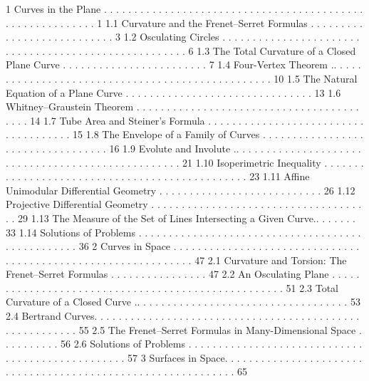 \documentclass[a4paper,10pt]{article}
\begin{document}
1 Curves in the Plane 
. . . . . . . . . . . . . . . . . . . . . . . . . . . . . . . . . . . . . . . . . . . . . . . . . . . . . . . . . . 1
1.1 Curvature and the Frenet–Serret Formulas 
. . . . . . . . . . . . . . . . . . . . . . . . . . . 3
1.2 Osculating Circles 
. . . . . . . . . . . . . . . . . . . . . . . . . . . . . . . . . . . . . . . . . . . . . . . . . . . . . 6
1.3 The Total Curvature of a Closed Plane Curve
. . . . . . . . . . . . . . . . . . . . . . . . 7
1.4 Four-Vertex Theorem
.. . . . . . . . . . . . . . . . . . . . . . . . . . . . . . . . . . . . . . . . . . . . . . . . . 10
1.5 The Natural Equation of a Plane Curve
. . . . . . . . . . . . . . . . . . . . . . . . . . . . . . . 13
1.6 Whitney–Graustein Theorem
. . . . . . . . . . . . . . . . . . . . . . . . . . . . . . . . . . . . . . . . . 14
1.7 Tube Area and Steiner’s Formula
. . . . . . . . . . . . . . . . . . . . . . . . . . . . . . . . . . . . . 15
1.8 The Envelope of a Family of Curves
. . . . . . . . . . . . . . . . . . . . . . . . . . . . . . . . . . 16
1.9 Evolute and Involute
.. . . . . . . . . . . . . . . . . . . . . . . . . . . . . . . . . . . . . . . . . . . . . . . . . . 21
1.10 Isoperimetric Inequality
. . . . . . . . . . . . . . . . . . . . . . . . . . . . . . . . . . . . . . . . . . . . . . . 23
1.11 Affine Unimodular Differential Geometry
. . . . . . . . . . . . . . . . . . . . . . . . . . . 26
1.12 Projective Differential Geometry . . . . . . . . . . . . . . . . . . . . . . . . . . . . . . . . . . . . . 29
1.13 The Measure of the Set of Lines Intersecting a Given Curve.. . . . . . . 33
1.14 Solutions of Problems . . . . . . . . . . . . . . . . . . . . . . . . . . . . . . . . . . . . . . . . . . . . . . . . . 36
2 Curves in Space . . . . . . . . . . . . . . . . . . . . . . . . . . . . . . . . . . . . . . . . . . . . . . . . . . . . . . . . . . . . . . 47
2.1 Curvature and Torsion: The Frenet–Serret Formulas . . . . . . . . . . . . . . . . 47
2.2 An Osculating Plane . . . . . . . . . . . . . . . . . . . . . . . . . . . . . . . . . . . . . . . . . . . . . . . . . . . 51
2.3 Total Curvature of a Closed Curve .. . . . . . . . . . . . . . . . . . . . . . . . . . . . . . . . . . . 53
2.4 Bertrand Curves. . . . . . . . . . . . . . . . . . . . . . . . . . . . . . . . . . . . . . . . . . . . . . . . . . . . . . . . 55
2.5 The Frenet–Serret Formulas in Many-Dimensional Space . . . . . . . . . . 56
2.6 Solutions of Problems . . . . . . . . . . . . . . . . . . . . . . . . . . . . . . . . . . . . . . . . . . . . . . . . . 57
3 Surfaces in Space. . . . . . . . . . . . . . . . . . . . . . . . . . . . . . . . . . . . . . . . . . . . . . . . . . . . . . . . . . . . . 65
\end{document}
